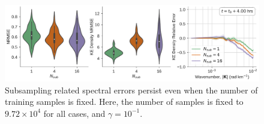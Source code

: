 \begin{figure}
    \centering
    \includegraphics[width=\textwidth]{../figures/rc_fixed_steps.pdf}
    \caption{Subsampling related spectral errors persist even when the number of
        training samples is fixed. Here, the number of samples is fixed to
        $9.72\times10^{4}$ for all cases, and $\gamma=10^{-1}$.
    }
    \label{fig:esn-fixed-steps}
\end{figure}
